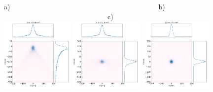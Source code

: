 \documentclass[a4paper, 11pt]{article}
\begin{document}
\begin{figure}[h]
\flushleft
a)~~~~~~~~~~~~~~~~~~~~~~~~~~~~~~~~~~~~~~~~~~~b)~~~~~~~~~~~~~~~~~~~~~~~~~~~~~~~~~~~~~~~~~~~c)\\
\centering
\includegraphics[width=0.32\textwidth]{figures/als_toroid.png}
\includegraphics[width=0.32\textwidth]{figures/als_parabolic-cone.png}
\includegraphics[width=0.32\textwidth]{figures/als_diaboloid.png}


\end{figure}
\end{document}
